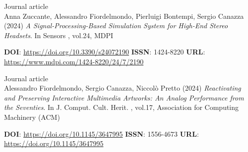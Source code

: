 \documentclass[7pt,a4paper]{article}
\begin{document}
\begin{mdframed}[
    backgroundcolor=white,
    linecolor=white,
    linewidth=0pt,
    innerleftmargin=6pt,
    innerrightmargin=6pt,
    innertopmargin=6pt,
    innerbottommargin=6pt,
    skipabove=0pt,
    skipbelow=0pt
]

\scriptsize Journal article\\
\normalsize Anna Zuccante, Alessandro Fiordelmondo, Pierluigi Bontempi, Sergio Canazza
(2024) \textit{A Signal-Processing-Based Simulation System for High-End Stereo Headsets}.
In
 Sensors
, vol.24, MDPI

\vspace{0.1cm}
\scriptsize  \textbf{DOI}: \href{https://doi.org/10.3390/s24072190}{https://doi.org/10.3390/s24072190}
\scriptsize 
\scriptsize  \textbf{ISSN}: 1424-8220 
\scriptsize  \textbf{URL}: \href{https://www.mdpi.com/1424-8220/24/7/2190}{https://www.mdpi.com/1424-8220/24/7/2190}
\vspace{0.15cm}
\end{mdframed}




\begin{mdframed}[
    backgroundcolor=entrygray,
    linecolor=entrygray,
    linewidth=0pt,
    innerleftmargin=6pt,
    innerrightmargin=6pt,
    innertopmargin=6pt,
    innerbottommargin=6pt,
    skipabove=0pt,
    skipbelow=0pt
]

\scriptsize Journal article\\
\normalsize Alessandro Fiordelmondo, Sergio Canazza, Niccolò Pretto
(2024) \textit{Reactivating and Preserving Interactive Multimedia Artworks: An Analog Performance from the Seventies}.
In
 J. Comput. Cult. Herit.
, vol.17, Association for Computing Machinery (ACM)

\vspace{0.1cm}
\scriptsize  \textbf{DOI}: \href{https://doi.org/10.1145/3647995}{https://doi.org/10.1145/3647995}
\scriptsize 
\scriptsize  \textbf{ISSN}: 1556-4673 
\scriptsize  \textbf{URL}: \href{https://doi.org/10.1145/3647995}{https://doi.org/10.1145/3647995}
\vspace{0.15cm}
\end{mdframed}
\end{document}
